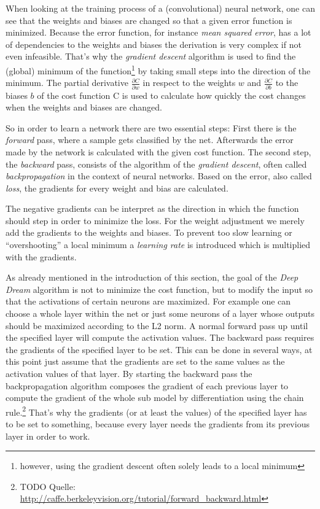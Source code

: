When looking at the training process of a (convolutional) neural network, one can see that the weights and biases are changed so that a given error function is minimized.
Because the error function, for instance \emph{mean squared error}, has a lot of dependencies to the weights and biases the derivation is very complex if not even infeasible.
That's why the \emph{gradient descent} algorithm is used to find the (global) minimum of the function\footnote{however, using the gradient descent often solely leads to a local minimum} by taking small steps into the direction of the minimum.
The partial derivative $\frac{\partial C}{\partial w}$ in respect to the weights $w$ and $\frac{\partial C}{\partial b}$ to the biases $b$ of the cost function C is used to calculate how quickly the cost changes when the weights and biases are changed.

So in order to learn a network there are two essential steps:
First there is the \emph{forward} pass, where a sample gets classified by the net.
Afterwards the error made by the network is calculated with the given cost function.
The second step, the \emph{backward} pass, consists of the algorithm of the \emph{gradient descent}, often called \emph{backpropagation} in the context of neural networks.
Based on the error, also called \emph{loss}, the gradients for every weight and bias are calculated.

The negative gradients can be interpret as the direction in which the function should step in order to minimize the loss.
For the weight adjustment we merely add the gradients to the weights and biases.
To prevent too slow learning or \enquote{overshooting} a local minimum a \emph{learning rate} is introduced which is multiplied with the gradients.

As already mentioned in the introduction of this section, the goal of the \emph{Deep Dream} algorithm is not to minimize the cost function, but to modify the input so that the activations of certain neurons are maximized.
For example one can choose a whole layer within the net or just some neurons of a layer whose outputs should be maximized according to the L2 norm.
A normal forward pass up until the specified layer will compute the activation values.
The backward pass requires the gradients of the specified layer to be set.
This can be done in several ways, at this point just assume that the gradients are set to the same values as the activation values of that layer.
By starting the backward pass the backpropagation algorithm composes the gradient of each previous layer to compute the gradient of the whole sub model by differentiation using the chain rule.\footnote{TODO Quelle: \url{http://caffe.berkeleyvision.org/tutorial/forward_backward.html}}
That's why the gradients (or at least the values) of the specified layer has to be set to something, because every layer needs the gradients from its previous layer in order to work.


